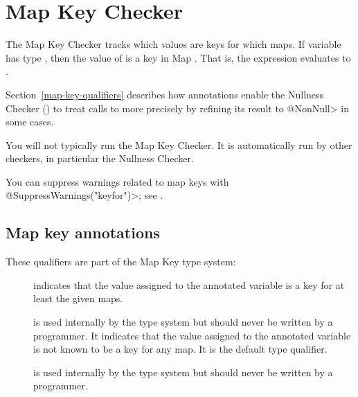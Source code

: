 \htmlhr
\chapter{Map Key Checker\label{map-key-checker}}

The Map Key Checker tracks which values are keys for which maps.  If variable
 has type , then the value of  is a key
in Map .  That is, the expression  evaluates to
.

Section~\ref{map-key-qualifiers} describes how  annotations
enable the
Nullness Checker () to treat calls to
more precisely by refining its result to \<@NonNull> in some cases.

You will not typically run the Map Key Checker.  It is automatically run by
other checkers, in particular the Nullness Checker.

You can suppress warnings related to map keys with
\<@SuppressWarnings("keyfor")>; see .

\section{Map key annotations\label{map-key-annotations}}

These qualifiers are part of the Map Key type system:

\begin{description}

\item[]
  indicates that the value assigned to the annotated variable is a key for at
  least the given maps.

\item[]
  is used internally by the type system but should never be written by a
  programmer.  It indicates that the value assigned to the annotated
  variable is not known to be a key for any map.  It is the default type
  qualifier.
  
\item[]
  is used internally by the type system but should never be written by a
  programmer.  

\end{description}  

